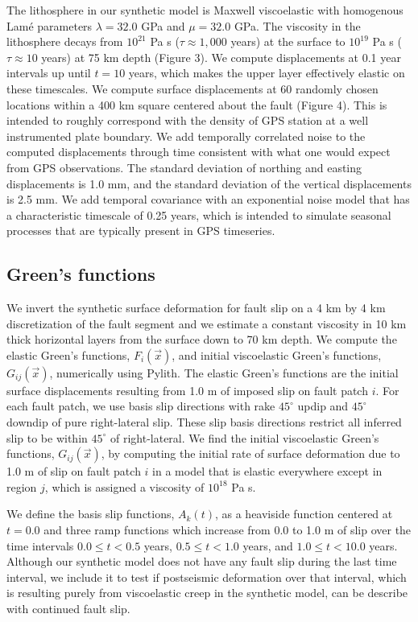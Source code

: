 \documentclass[extra]{gji}
\begin{document}
The lithosphere in our synthetic model is Maxwell viscoelastic with
homogenous Lam\'e parameters $\lambda = 32.0$ GPa and $\mu = 32.0$
GPa.  The viscosity in the lithosphere decays from $10^{21}$ Pa s
($\tau\approx1,000$ years) at the surface to $10^{19}$ Pa s
($\tau\approx10$ years) at 75 km depth (Figure 3).  We compute
displacements at 0.1 year intervals up until $t=10$ years, which makes
the upper layer effectively elastic on these timescales. We compute
surface displacements at 60 randomly chosen locations within a 400 km
square centered about the fault (Figure 4).  This is intended to
roughly correspond with the density of GPS station at a well
instrumented plate boundary.  We add temporally correlated noise to
the computed displacements through time consistent with what one would
expect from GPS observations.  The standard deviation of northing and
easting displacements is 1.0 mm, and the standard deviation of the
vertical displacements is 2.5 mm.  We add temporal covariance with an
exponential noise model that has a characteristic timescale of 0.25
years, which is intended to simulate seasonal processes that are
typically present in GPS timeseries.

\subsection{Green's functions}

We invert the synthetic surface deformation for fault slip on a 4 km
by 4 km discretization of the fault segment and we estimate a constant
viscosity in 10 km thick horizontal layers from the surface down to 70
km depth. We compute the elastic Green's functions, $F_i(\vec{x})$,
and initial viscoelastic Green's functions, $G_{ij}(\vec{x})$,
numerically using Pylith.  The elastic Green’s functions are the
initial surface displacements resulting from 1.0 m of imposed slip on
fault patch $i$.  For each fault patch, we use basis slip directions
with rake $45^\circ$ updip and $45^\circ$ downdip of pure
right-lateral slip.  These slip basis directions restrict all inferred
slip to be within $45^\circ$ of right-lateral. We find the initial
viscoelastic Green's functions, $G_{ij}(\vec{x})$, by computing the
initial rate of surface deformation due to 1.0 m of slip on fault
patch $i$ in a model that is elastic everywhere except in region $j$,
which is assigned a viscosity of $10^{18}$ Pa s.

We define the basis slip functions, $A_k(t)$, as a heaviside function
centered at $t=0.0$ and three ramp functions which increase from 0.0
to 1.0 m of slip over the time intervals $0.0\leq t < 0.5$ years,
$0.5\leq t < 1.0$ years, and $1.0\leq t < 10.0$ years.  Although our
synthetic model does not have any fault slip during the last time
interval, we include it to test if postseismic deformation over that
interval, which is resulting purely from viscoelastic creep in the
synthetic model, can be describe with continued fault slip.
\end{document}
